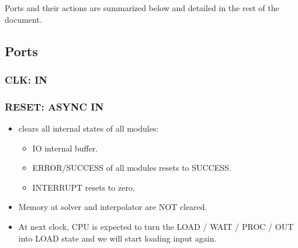 \documentclass[12pt]{report}
\begin{document}
Ports and their actions are summarized below and detailed in the rest of the document.

\subsection{Ports}
\label{sec:interface:ports}

\subsubsection{CLK: IN}

\subsubsection{RESET: ASYNC IN}
\begin{itemize}
    \item clears all internal states of all modules:
    \begin{itemize}
        \item IO internal buffer.
        \item ERROR/SUCCESS of all modules resets to SUCCESS.
        \item INTERRUPT resets to zero.
    \end{itemize}
    \item Memory at solver and interpolator are NOT cleared.
    \item At next clock, CPU is expected to turn the {LOAD / WAIT / PROC / OUT} into {LOAD} state and we will start loading input again.
\end{itemize}
\end{document}
